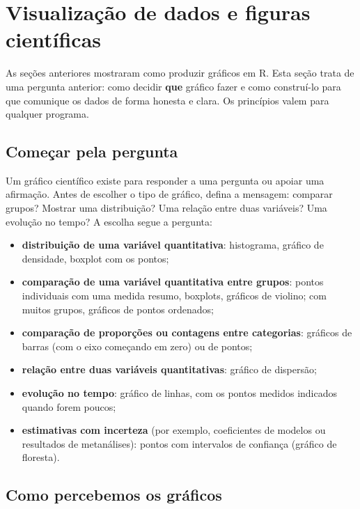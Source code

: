 \documentclass[
]{book}
\providecommand{\tightlist}{%
  \setlength{\itemsep}{0pt}\setlength{\parskip}{0pt}}
\begin{document}
\section{Visualização de dados e figuras científicas}\label{visualizauxe7uxe3o-de-dados-e-figuras-cientuxedficas}

As seções anteriores mostraram como produzir gráficos em R. Esta seção trata de uma pergunta anterior: como decidir \textbf{que} gráfico fazer e como construí-lo para que comunique os dados de forma honesta e clara. Os princípios valem para qualquer programa.

\subsection{Começar pela pergunta}\label{comeuxe7ar-pela-pergunta}

Um gráfico científico existe para responder a uma pergunta ou apoiar uma afirmação. Antes de escolher o tipo de gráfico, defina a mensagem: comparar grupos? Mostrar uma distribuição? Uma relação entre duas variáveis? Uma evolução no tempo? A escolha segue a pergunta:

\begin{itemize}
\tightlist
\item
  \textbf{distribuição de uma variável quantitativa}: histograma, gráfico de densidade, boxplot com os pontos;
\item
  \textbf{comparação de uma variável quantitativa entre grupos}: pontos individuais com uma medida resumo, boxplots, gráficos de violino; com muitos grupos, gráficos de pontos ordenados;
\item
  \textbf{comparação de proporções ou contagens entre categorias}: gráficos de barras (com o eixo começando em zero) ou de pontos;
\item
  \textbf{relação entre duas variáveis quantitativas}: gráfico de dispersão;
\item
  \textbf{evolução no tempo}: gráfico de linhas, com os pontos medidos indicados quando forem poucos;
\item
  \textbf{estimativas com incerteza} (por exemplo, coeficientes de modelos ou resultados de metanálises): pontos com intervalos de confiança (gráfico de floresta).
\end{itemize}

\subsection{Como percebemos os gráficos}\label{como-percebemos-os-gruxe1ficos}
\end{document}
